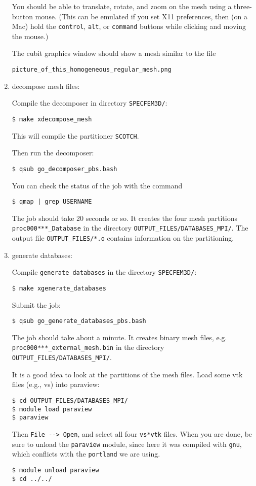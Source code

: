 \documentclass[10pt,fleqn,letterpaper]{article}
\begin{document}
\begin{enumerate}
You should be able to translate, rotate, and zoom on the mesh using a three-button mouse. (This can be emulated if you set X11 preferences, then (on a Mac) hold the \verb+control+, \verb+alt+, or \verb+command+ buttons while clicking and moving the mouse.)

The cubit graphics window should show a mesh similar to the file
\begin{verbatim}
picture_of_this_homogeneous_regular_mesh.png
\end{verbatim}

\item decompose mesh files:

Compile the decomposer in directory \verb+SPECFEM3D/+:
\begin{lstlisting}
$ make xdecompose_mesh
\end{lstlisting}
%
This will compile the partitioner \verb+SCOTCH+.

Then run the decomposer:
\begin{lstlisting}
$ qsub go_decomposer_pbs.bash
\end{lstlisting}
%
You can check the status of the job with the command
%
\begin{lstlisting}
$ qmap | grep USERNAME
\end{lstlisting}
%
The job should take 20 seconds or so. It creates the four mesh partitions \verb+proc000***_Database+ in the directory \verb+OUTPUT_FILES/DATABASES_MPI/+. The output file \verb+OUTPUT_FILES/*.o+ contains information on the partitioning.

\item generate databases:

Compile \verb+generate_databases+ in the directory \verb+SPECFEM3D/+:
\begin{lstlisting}
$ make xgenerate_databases
\end{lstlisting}
Submit the job:
\begin{lstlisting}
$ qsub go_generate_databases_pbs.bash
\end{lstlisting}

The job should take about a minute.
It creates binary mesh files, e.g. \verb+proc000***_external_mesh.bin+ in the directory \verb+OUTPUT_FILES/DATABASES_MPI/+.

It is a good idea to look at the partitions of the mesh files. Load some vtk files (e.g., vs) into paraview:
\begin{lstlisting}
$ cd OUTPUT_FILES/DATABASES_MPI/
$ module load paraview
$ paraview
\end{lstlisting}
%
Then \verb+File --> Open+, and select all four \verb+vs*vtk+ files. When you are done, be sure to unload the \verb+paraview+ module, since here it was compiled with \verb+gnu+, which conflicts with the \verb+portland+ we are using.
%
\begin{lstlisting}
$ module unload paraview
$ cd ../../
\end{lstlisting}


\end{enumerate}
\end{document}
